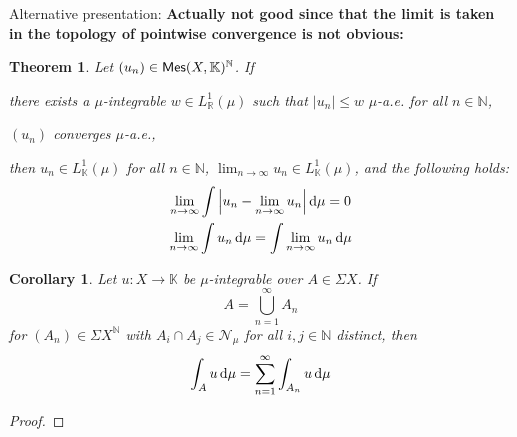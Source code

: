\documentclass[11pt, a4paper, openany]{book}
\newtheorem{thm}{Theorem}\newtheorem{lem}{Lemma}\newtheorem{crl}{Corollary}
\theoremstyle{definition}
\newcommand{\cat}[1]{\textup{\textsf{#1}}}
\newenvironment{tight_enumerate}{\begin{enumerate}\itemsep -0.2em}{\end{enumerate}}
\begin{document}
    Alternative presentation: \textbf{Actually not good since that the limit is taken in the topology of pointwise convergence is not obvious:}
    \begin{thm}
        Let $(u_n)\in\cat{Mes}(X,\mathbb{K})^\mathbb{N}$. If
        \begin{tight_enumerate}
            \item there exists a $\mu$-integrable $w\in L^1_\mathbb{R}(\mu)$ such that $|u_n|\leqslant w\,\,\mu$-a.e. for all $n\in\mathbb{N}$,
            \item $(u_n)$ converges $\mu$-a.e.,
        \end{tight_enumerate}
        then $u_n\in L^1_\mathbb{K}(\mu)$ for all $n\in\mathbb{N}$, $\lim_{n\to\infty} u_n\in {L}^1_\mathbb{K}(\mu)$, and the following holds:
        \begin{gather*}
            \lim_{n\to\infty}\int \left|u_n-\lim_{n\to\infty} u_n\right|\odif\mu=0 \\
            \lim_{n\to\infty}\int u_n\odif\mu=\int \lim_{n\to\infty} u_n\odif\mu
        \end{gather*}
    \end{thm}
    \begin{crl}
        Let $u:X\rightarrow \mathbb{K}$ be $\mu$-integrable over $A\in\Sigma X$. If
        \[
            A=\bigcup_{n=1}^\infty A_n
        \]
        for $(A_n)\in\Sigma X^\mathbb{N}$ with $A_i\cap A_j\in\mathscr{N}_\mu$ for all $i,j\in\mathbb{N}$ distinct, then
        \[
            \int _Au\odif \mu=\sum_{n=1}^\infty\int_{A_n}u\odif\mu
        \]
    \end{crl}
    \begin{proof}
        
    \end{proof}
\end{document}
